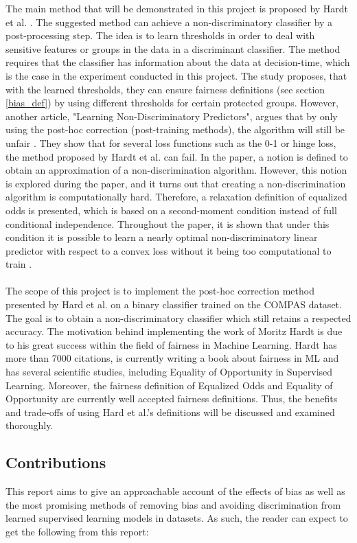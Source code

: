 \documentclass[11pt, fleqn, titlepage]{article}
\begin{document}
	\noindent The main method that will be demonstrated in this project is proposed by Hardt et al. \cite{equal_of_oppor}. The suggested method can achieve a non-discriminatory classifier by a post-processing step. The idea is to learn thresholds in order to deal with sensitive features or groups in the data in a discriminant classifier. The method requires that the classifier has information about the data at decision-time, which is the case in the experiment conducted in this project. The study proposes, that with the learned thresholds, they can ensure fairness definitions (see section \ref{bias_def}) by using different thresholds for certain protected groups. However, another article, "Learning Non-Discriminatory Predictors", argues that by only using the post-hoc correction (post-training methods), the algorithm will still be unfair \cite{b_woodworth}. They show that for several loss functions such as the 0-1 or hinge loss, the method proposed by Hardt et al. \cite{equal_of_oppor} can fail. In the paper, a notion is defined to obtain an approximation of a non-discrimination algorithm. However, this notion is explored during the paper, and it turns out that creating a non-discrimination algorithm is computationally hard. Therefore, a relaxation definition of equalized odds is presented, which is based on a second-moment condition instead of full conditional independence. Throughout the paper, it is shown that under this condition it is possible to learn a nearly optimal non-discriminatory linear predictor with respect to a convex loss without it being too computational to train \cite{b_woodworth}.\\\\
	The scope of this project is to implement the post-hoc correction method presented by Hard et al. on a binary classifier trained on the COMPAS dataset. The goal is to obtain a non-discriminatory classifier which still retains a respected accuracy. The motivation behind implementing the work of Moritz Hardt is due to his great success within the field of fairness in Machine Learning. Hardt has more than 7000 citations, is currently writing a book about fairness in ML and has several scientific studies, including Equality of Opportunity in Supervised Learning. Moreover, the fairness definition of Equalized Odds and Equality of Opportunity are currently well accepted fairness definitions. Thus, the benefits and trade-offs of using Hard et al.'s definitions will be discussed and examined thoroughly.
	
	\subsection{Contributions}
	This report aims to give an approachable account of the effects of bias as well as the most promising methods of removing bias and avoiding discrimination from learned supervised learning models in datasets. As such, the reader can expect to get the following from this report:
	
\end{document}
